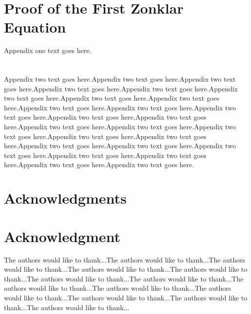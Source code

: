 \documentclass[10pt,journal,cspaper,compsoc]{IEEEtran}
\begin{document}
\appendices
\section{Proof of the First Zonklar Equation}
Appendix one text goes here.

\section{}
Appendix two text goes here.Appendix two text goes here.Appendix two text goes here.Appendix two text goes here.Appendix two text goes here.Appendix two text goes here.Appendix two text goes here.Appendix two text goes here.Appendix two text goes here.Appendix two text goes here.Appendix two text goes here.Appendix two text goes here.Appendix two text goes here.Appendix two text goes here.Appendix two text goes here.Appendix two text goes here.Appendix two text goes here.Appendix two text goes here.Appendix two text goes here.Appendix two text goes here.Appendix two text goes here.Appendix two text goes here.Appendix two text goes here.Appendix two text goes here.Appendix two text goes here.


\ifCLASSOPTIONcompsoc
  \section*{Acknowledgments}
\else
  \section*{Acknowledgment}
\fi


The authors would like to thank...The authors would like to thank...The authors would like to thank...The authors would like to thank...The authors would like to thank...The authors would like to thank...The authors would like to thank...The authors would like to thank...The authors would like to thank...The authors would like to thank...The authors would like to thank...The authors would like to thank...The authors would like to thank...


\ifCLASSOPTIONcaptionsoff
  \newpage
\fi
\end{document}
